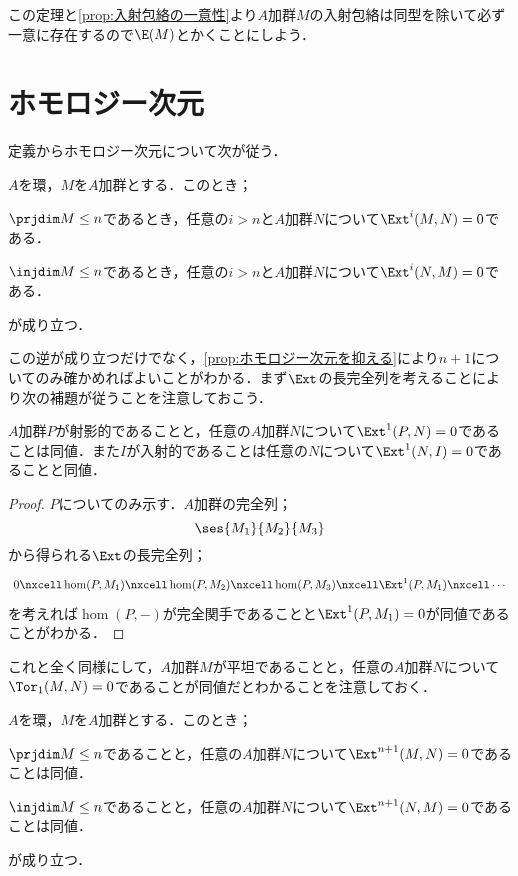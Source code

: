 この定理と\ref{prop:入射包絡の一意性}より$A$加群$M$の入射包絡は同型を除いて必ず一意に存在するので$\E(M)$とかくことにしよう．

\section{ホモロジー次元}
定義からホモロジー次元について次が従う．

\begin{lem}
	$A$を環，$M$を$A$加群とする．このとき；
	\begin{sakura}
		\item $\prjdim M\leq n$であるとき，任意の$i>n$と$A$加群$N$について$\Ext^{i}(M,N)=0$である．
		\item $\injdim M\leq n$であるとき，任意の$i>n$と$A$加群$N$について$\Ext^{i}(N,M)=0$である．
	\end{sakura}
	が成り立つ．
\end{lem}

この逆が成り立つだけでなく，\ref{prop:ホモロジー次元を抑える}により$n+1$についてのみ確かめればよいことがわかる．まず$\Ext$の長完全列を考えることにより次の補題が従うことを注意しておこう．

\begin{lem}
	$A$加群$P$が射影的であることと，任意の$A$加群$N$について$\Ext^1(P,N)=0$であることは同値．また$I$が入射的であることは任意の$N$について$\Ext^1(N,I)=0$であることと同値．
\end{lem}

\begin{proof}
	$P$についてのみ示す．$A$加群の完全列；
	\[\ses{M_1}{M_2}{M_3}\]
	から得られる$\Ext$の長完全列；
	\[\begin{tikzcd}
	0\nxcell\hom(P,M_1)\nxcell\hom(P,M_2)\nxcell\hom(P,M_3)\nxcell\Ext^1(P,M_1)\nxcell\cdots
	\end{tikzcd}\]
	を考えれば$\hom(P,-)$が完全関手であることと$\Ext^1(P,M_1)=0$が同値であることがわかる．
\end{proof}

これと全く同様にして，$A$加群$M$が平坦であることと，任意の$A$加群$N$について$\Tor_1(M,N)=0$であることが同値だとわかることを注意しておく．

\begin{prop}\label{prop:ホモロジー次元を抑える}
	$A$を環，$M$を$A$加群とする．このとき；
	\begin{sakura}
		\item $\prjdim M\leq n$であることと，任意の$A$加群$N$について$\Ext^{n+1}(M,N)=0$であることは同値．
		\item $\injdim M\leq n$であることと，任意の$A$加群$N$について$\Ext^{n+1}(N,M)=0$であることは同値．
	\end{sakura}
	が成り立つ．
\end{prop}

